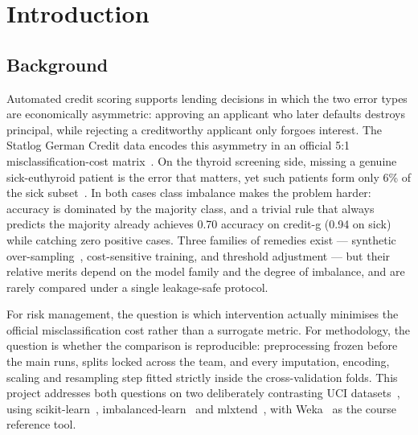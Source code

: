 \section{Introduction}
\label{sec:introduction}

\subsection{Background}
Automated credit scoring supports lending decisions in which the two error types
are economically asymmetric: approving an applicant who later defaults destroys
principal, while rejecting a creditworthy applicant only forgoes interest. The
Statlog German Credit data encodes this asymmetry in an official 5:1
misclassification-cost matrix~\cite{uci_credit_g_1994}. On the thyroid
screening side, missing a genuine sick-euthyroid patient is the error that
matters, yet such patients form only 6\% of the sick
subset~\cite{uci_thyroid_1986}. In both cases class imbalance makes the
problem harder: accuracy is dominated by the majority class, and a trivial rule
that always predicts the majority already achieves 0.70 accuracy on credit-g
(0.94 on sick) while catching zero positive cases. Three families of remedies
exist --- synthetic over-sampling~\cite{chawla2002smote}, cost-sensitive
training, and threshold adjustment --- but their relative merits depend on the
model family and the degree of imbalance, and are rarely compared under a single
leakage-safe protocol.

For risk management, the question is which intervention actually minimises the
official misclassification cost rather than a surrogate metric. For methodology,
the question is whether the comparison is reproducible: preprocessing frozen
before the main runs, splits locked across the team, and every imputation,
encoding, scaling and resampling step fitted strictly inside the cross-validation
folds. This project addresses both questions on two deliberately contrasting UCI
datasets~\cite{dua2019uci}, using
scikit-learn~\cite{pedregosa2011sklearn},
imbalanced-learn~\cite{lemaitre2017imblearn} and
mlxtend~\cite{raschka2018mlxtend}, with Weka~\cite{frank2016weka}
as the course reference tool.

